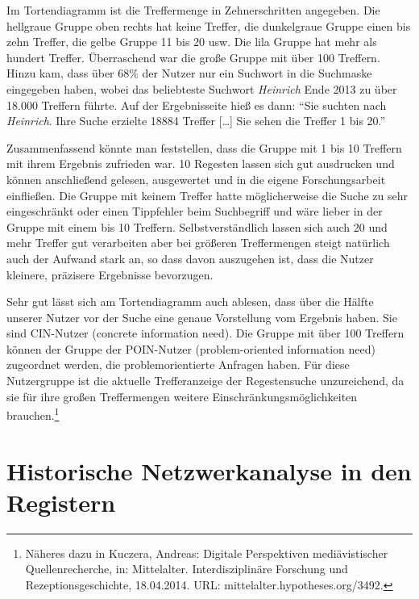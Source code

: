 \documentclass[ngerman,]{scrreprt}
\begin{document}
Im Tortendiagramm ist die Treffermenge in Zehnerschritten angegeben. Die hellgraue Gruppe oben rechts hat keine Treffer, die dunkelgraue Gruppe einen bis zehn Treffer, die gelbe Gruppe 11 bis 20 usw. Die lila Gruppe hat mehr als hundert Treffer. Überraschend war die große Gruppe mit über 100 Treffern. Hinzu kam, dass über 68\% der Nutzer nur ein Suchwort in die Suchmaske eingegeben haben, wobei das beliebteste Suchwort \emph{Heinrich} Ende 2013 zu über 18.000 Treffern führte. Auf der Ergebnisseite hieß es dann: ``Sie suchten nach \emph{Heinrich}. Ihre Suche erzielte 18884 Treffer {[}\ldots{}{]} Sie sehen die Treffer 1 bis 20.''

Zusammenfassend könnte man feststellen, dass die Gruppe mit 1 bis 10 Treffern mit ihrem Ergebnis zufrieden war. 10 Regesten lassen sich gut ausdrucken und können anschließend gelesen, ausgewertet und in die eigene Forschungsarbeit einfließen. Die Gruppe mit keinem Treffer hatte möglicherweise die Suche zu sehr eingeschränkt oder einen Tippfehler beim Suchbegriff und wäre lieber in der Gruppe mit einem bis 10 Treffern. Selbstverständlich lassen sich auch 20 und mehr Treffer gut verarbeiten aber bei größeren Treffermengen steigt natürlich auch der Aufwand stark an, so dass davon auszugehen ist, dass die Nutzer kleinere, präzisere Ergebnisse bevorzugen.

Sehr gut lässt sich am Tortendiagramm auch ablesen, dass über die Hälfte unserer Nutzer vor der Suche eine genaue Vorstellung vom Ergebnis haben. Sie sind CIN-Nutzer (concrete information need). Die Gruppe mit über 100 Treffern können der Gruppe der POIN-Nutzer (problem-oriented information need) zugeordnet werden, die problemorientierte Anfragen haben. Für diese Nutzergruppe ist die aktuelle Trefferanzeige der Regestensuche unzureichend, da sie für ihre großen Treffermengen weitere Einschränkungsmöglichkeiten brauchen.\footnote{Näheres dazu in Kuczera, Andreas: Digitale Perspektiven mediävistischer Quellenrecherche, in: Mittelalter. Interdisziplinäre Forschung und Rezeptionsgeschichte, 18.04.2014. URL: mittelalter.hypotheses.org/3492.}

\section{Historische Netzwerkanalyse in den Registern}\label{historische-netzwerkanalyse-in-den-registern}
\end{document}
